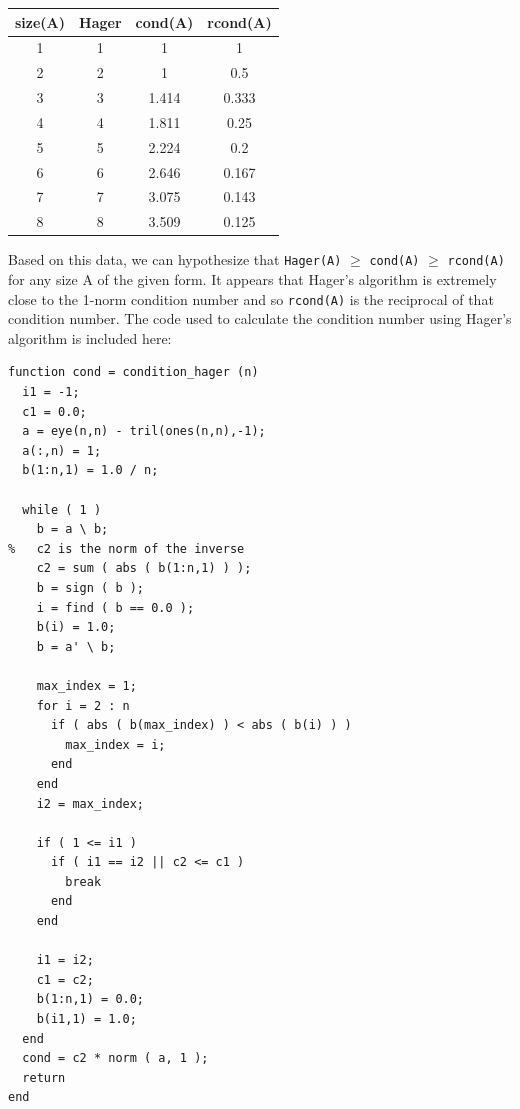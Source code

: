 \documentclass[12pt,letterpaper,reqno]{amsart}
\begin{document}
\begin{enumerate}
\begin{enumerate}
\begin{flushleft}
    \end{flushleft}
    \begin{center}
    \begin{tabular}{ |c|c|c|c| } 
    \hline
    size(A) & Hager & cond(A) & rcond(A) \\
    \hline
    1   &   1   &   1   &   1\\
    2   &   2   &   1   &   0.5\\
    3   &   3   &   1.414   &   0.333\\ 
    4   &   4   &   1.811   &   0.25\\
    5   &   5   &   2.224   &   0.2\\
    6   &   6   &   2.646   &   0.167\\
    7   &   7   &   3.075   &   0.143\\
    8   &   8   &   3.509   &   0.125\\ 
    \hline
    \end{tabular}
    \end{center}
    \vspace{.15in}
    \begin{flushleft}
    Based on this data, we can hypothesize that \texttt{Hager(A)} $\geq$ \texttt{cond(A)} $\geq$ \texttt{rcond(A)} for any size A of the given form. It appears that Hager's algorithm is extremely close to the 1-norm condition number and so \texttt{rcond(A)} is the reciprocal of that condition number. The code used to calculate the condition number using Hager's algorithm is included here:\newline
    \end{flushleft}
    \begin{lstlisting}
function cond = condition_hager (n)
  i1 = -1;
  c1 = 0.0;
  a = eye(n,n) - tril(ones(n,n),-1);
  a(:,n) = 1;
  b(1:n,1) = 1.0 / n;

  while ( 1 )
    b = a \ b;
%   c2 is the norm of the inverse
    c2 = sum ( abs ( b(1:n,1) ) );
    b = sign ( b );
    i = find ( b == 0.0 );
    b(i) = 1.0;
    b = a' \ b;
    
    max_index = 1;
    for i = 2 : n
      if ( abs ( b(max_index) ) < abs ( b(i) ) )
        max_index = i;
      end
    end
    i2 = max_index;

    if ( 1 <= i1 )
      if ( i1 == i2 || c2 <= c1 )
        break
      end
    end

    i1 = i2;
    c1 = c2;
    b(1:n,1) = 0.0;
    b(i1,1) = 1.0;
  end
  cond = c2 * norm ( a, 1 );
  return
end
\end{lstlisting}

\end{enumerate}
\end{enumerate}
\end{document}
